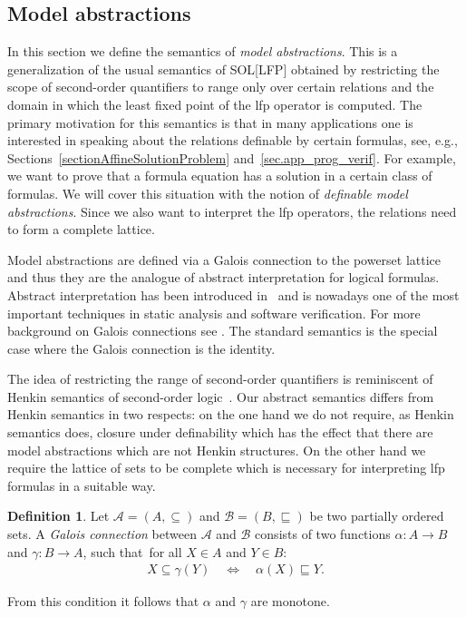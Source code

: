 \documentclass[acmsmall]{acmart}
\theoremstyle{plain}
\theoremstyle{definition}
\newtheorem{definition}[theorem]{Definition}
\newcommand{\calA}{\mathcal{A}}
\newcommand{\calB}{\mathcal{B}}
\begin{document}
\subsection{Model abstractions}\label{sec.model_abstractions}

In this section we define the semantics of {\em model abstractions}.
This is a generalization of the usual semantics of SOL[LFP] obtained by
 restricting the scope of second-order quantifiers to range only over
 certain relations and the domain in which the least fixed point
 of the lfp operator is computed.
The primary motivation for this semantics is that in many applications
 one is interested in speaking about the relations definable
 by certain formulas, see, e.g., Sections~\ref{sectionAffineSolutionProblem}
 and~\ref{sec.app_prog_verif}.
For example, we want to prove that a formula equation has a solution
 in a certain class of formulas.
We will cover this situation with the notion of {\em definable model abstractions}.
Since we also want to interpret the lfp operators, the relations need
 to form a complete lattice.

Model abstractions are defined via a Galois connection to the
 powerset lattice and thus they are the analogue of abstract
 interpretation for logical formulas.
Abstract interpretation has been introduced in~\cite{Cousot77Abstract} and is nowadays one of the most important techniques
in static analysis and software verification.
 For more background on Galois connections see \cite{Davey2002}.
The standard semantics is the special case where the Galois connection is the identity.

The idea of restricting the range of second-order quantifiers is reminiscent
 of Henkin semantics of second-order logic~\cite{Henkin50Completeness}.
Our abstract semantics differs from Henkin semantics in two
 respects: on the one hand we do not require, as Henkin semantics does, closure under definability which has the effect that there are
 model abstractions which are not Henkin structures.
On the other hand we require the lattice of sets to be complete which
 is necessary for interpreting lfp formulas in a suitable way.

\begin{definition}
	Let $\calA = (A,\subseteq)$ and $\calB = (B,\sqsubseteq)$ be two partially ordered sets.
	A \emph{Galois connection} between $\calA$ and $\calB$ consists of two functions
	$\alpha: A \rightarrow B$ and $\gamma: B \rightarrow A$, such that\ for all $X \in A$
	and $Y \in B$:
	\begin{align*}
		X \subseteq \gamma(Y) \quad \Leftrightarrow \quad \alpha(X) \sqsubseteq Y.
	\end{align*}
\end{definition}
From this condition it follows that $\alpha$ and $\gamma$ are monotone.
\end{document}
